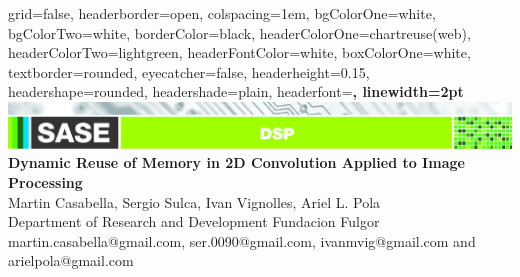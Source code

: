 \documentclass[a1paper,portrait,fontscale=0.43]{baposter}
\begin{document}

\begin{poster}
{
grid=false,
headerborder=open, %
colspacing=1em, %
bgColorOne=white, %
bgColorTwo=white, %
borderColor=black, %
headerColorOne=chartreuse(web), %
headerColorTwo=lightgreen, %
headerFontColor=white, %
boxColorOne=white, %
textborder=rounded, %
eyecatcher=false, %
headerheight=0.15\textheight, %
headershape=rounded, %
headershade=plain,
headerfont=\Large\bf\textsf, %
linewidth=2pt %
}
{}
%
%
{  
  {\includegraphics[width=\textwidth]{DSP-02}\vspace{0.2em}} %
  \bf\textsf %
  {Dynamic Reuse of Memory in 2D Convolution Applied to Image Processing}
} %
{{\sf\vspace{0.2em}\\
    Martin Casabella,
    Sergio Sulca,
    Ivan Vignolles,
    Ariel L. Pola
\vspace{0.2em}\\
\small{Department of Research and Development Fundacion Fulgor 
\vspace{0.2em}\\
martin.casabella@gmail.com, ser.0090@gmail.com,
    ivanmvig@gmail.com and arielpola@gmail.com}
}\vspace{1em}}


\end{poster}
\end{document}
